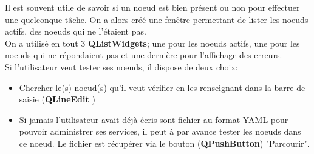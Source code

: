 \documentclass[a4paper,11pt]{article}
\begin{document}
Il est souvent utile de savoir si un noeud est bien présent ou non pour effectuer une quelconque tâche. On a alors créé une fenêtre permettant de lister les noeuds actifs, des noeuds qui ne l'étaient pas.\\
On a utilisé en tout 3 \textbf{QListWidgets}; une pour les noeuds actifs, une pour les noeuds qui ne répondaient pas et une dernière pour l'affichage des erreurs.\\
Si l'utilisateur veut tester ses noeuds, il dispose de deux choix:
\begin{itemize}
 \item Chercher le(s) noeud(s) qu'il veut vérifier en les renseignant dans la barre de saisie (\textbf{QLineEdit} )
 \item Si jamais l'utilisateur avait déjà écris sont fichier au format YAML pour pouvoir administrer ses services, il peut à par avance tester les noeuds dans ce noeud. Le fichier est récupérer via le bouton (\textbf{QPushButton}) "Parcourir".
 \end{itemize}
\end{document}
